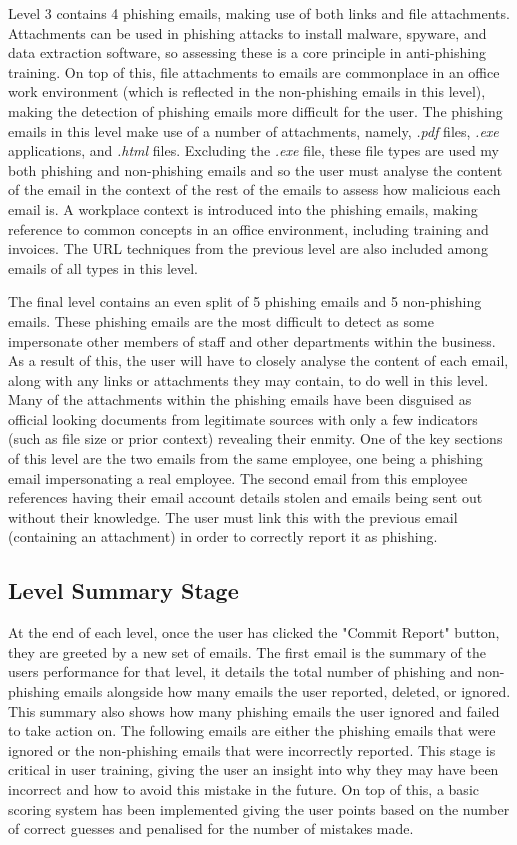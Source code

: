 \documentclass{l4proj}
\begin{document}
Level 3 contains 4 phishing emails, making use of both links and file attachments. Attachments can be used in phishing attacks to install malware, spyware, and data extraction software, so assessing these is a core principle in anti-phishing training. On top of this, file attachments to emails are commonplace in an office work environment (which is reflected in the non-phishing emails in this level), making the detection of phishing emails more difficult for the user. The phishing emails in this level make use of a number of attachments, namely, \textit{.pdf} files, \textit{.exe} applications, and \textit{.html} files. Excluding the \textit{.exe} file, these file types are used my both phishing and non-phishing emails and so the user must analyse the content of the email in the context of the rest of the emails to assess how malicious each email is. A workplace context is introduced into the phishing emails, making reference to common concepts in an office environment, including training and invoices. The URL techniques from the previous level are also included among emails of all types in this level.

The final level contains an even split of 5 phishing emails and 5 non-phishing emails. These phishing emails are the most difficult to detect as some impersonate other members of staff and other departments within the business. As a result of this, the user will have to closely analyse the content of each email, along with any links or attachments they may contain, to do well in this level. Many of the attachments within the phishing emails have been disguised as official looking documents from legitimate sources with only a few indicators (such as file size or prior context) revealing their enmity. One of the key sections of this level are the two emails from the same employee, one being a phishing email impersonating a real employee. The second email from this employee references having their email account details stolen and emails being sent out without their knowledge. The user must link this with the previous email (containing an attachment) in order to correctly report it as phishing.

\subsection{Level Summary Stage}
At the end of each level, once the user has clicked the "Commit Report" button, they are greeted by a new set of emails. The first email is the summary of the users performance for that level, it details the total number of phishing and non-phishing emails alongside how many emails the user reported, deleted, or ignored. This summary also shows how many phishing emails the user ignored and failed to take action on. The following emails are either the phishing emails that were ignored or the non-phishing emails that were incorrectly reported. This stage is critical in user training, giving the user an insight into why they may have been incorrect and how to avoid this mistake in the future. On top of this, a basic scoring system has been implemented giving the user points based on the number of correct guesses and penalised for the number of mistakes made. 
\end{document}

